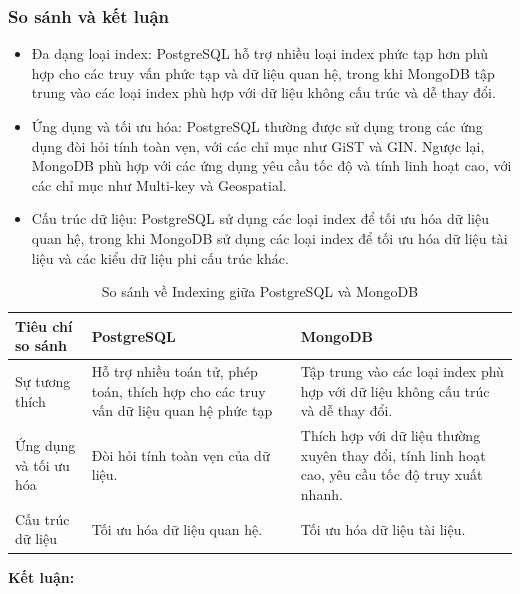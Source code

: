 \subsubsection{So sánh và kết luận}
\begin{itemize}
    \item Đa dạng loại index: PostgreSQL hỗ trợ nhiều loại index phức tạp hơn phù hợp cho các truy vấn phức tạp và dữ liệu quan hệ, trong khi MongoDB tập trung vào các loại index phù hợp với dữ liệu không cấu trúc và dễ thay đổi.
    \item Ứng dụng và tối ưu hóa: PostgreSQL thường được sử dụng trong các ứng dụng đòi hỏi tính toàn vẹn, với các chỉ mục như GiST và GIN. Ngược lại, MongoDB phù hợp với các ứng dụng yêu cầu tốc độ và tính linh hoạt cao, với các chỉ mục như Multi-key và Geospatial.
    \item  Cấu trúc dữ liệu: PostgreSQL sử dụng các loại index để tối ưu hóa dữ liệu quan hệ, trong khi MongoDB sử dụng các loại index để tối ưu hóa dữ liệu tài liệu và các kiểu dữ liệu phi cấu trúc khác.
\end{itemize}
\begin{table}[H]
    \centering
    \begin{tabular}{|L{3.2cm}|L{5cm}|L{5cm}|} \hline 
         \textbf{Tiêu chí so sánh }&  \textbf{PostgreSQL}&  \textbf{MongoDB}\\ \hline 
         Sự tương thích &  Hỗ trợ nhiều toán tử, phép toán, thích hợp cho các truy vấn dữ liệu quan hệ phức tạp & Tập trung vào các loại index phù hợp với dữ liệu không cấu trúc và dễ thay đổi.\\ \hline 
         Ứng dụng và tối ưu hóa &  Đòi hỏi tính toàn vẹn của dữ liệu. & Thích hợp với dữ liệu thường xuyên thay đổi, tính linh hoạt cao, yêu cầu tốc độ truy xuất nhanh.\\ \hline 
         Cấu trúc dữ liệu &  Tối ưu hóa dữ liệu quan hệ. &  Tối ưu hóa dữ liệu tài liệu.\\ \hline
    \end{tabular}
    \caption{So sánh về Indexing giữa PostgreSQL và MongoDB}
    \label{tab:indexing}
\end{table}
\indent \textbf{Kết luận:}

\newpage





